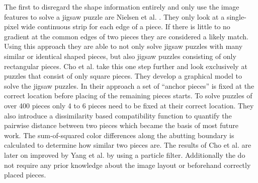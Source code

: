 \documentclass[11pt]{report}
\begin{document}
The first to disregard the shape information entirely and only use the image
features to solve a jigsaw puzzle are Nielsen et al. \cite{nielsen2008solving}.
They only look at a single-pixel wide continuous strip for each edge of a piece.
If there is little to no gradient at the common edges of two pieces they are
considered a likely match. Using this approach they are able to not only solve
jigsaw puzzles with many similar or identical shaped pieces, but also jigsaw
puzzles consisting of only rectangular pieces. Cho et al. \cite{Cho2010} take
this one step further and look exclusively at puzzles that consist of only
square pieces. They develop a graphical model to solve the jigsaw puzzles. In
their approach a set of ``anchor pieces'' is fixed at the correct location
before placing of the remaining pieces starts. To solve puzzles of over 400
pieces only 4 to 6 pieces need to be fixed at their correct location. They also
introduce a dissimilarity based compatibility function to quantify the pairwise
distance between two pieces which became the basis of most future work. The
sum-of-squared color differences along the abutting boundary is calculated to
determine how similar two pieces are. The results of Cho et al. are later on
improved by Yang et al.\cite{yang2011particle} by using a particle filter.
Additionally the do not require any prior knowledge about the image layout or
beforehand correctly placed pieces.
\end{document}
